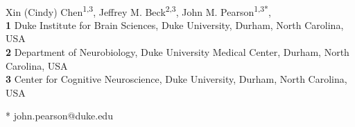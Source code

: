 \documentclass[10pt,letterpaper]{article}
\date{}
\begin{document}
\vspace*{0.2in}

\begin{flushleft}
{\Large
\textbf{} %
}
\newline
\\
Xin (Cindy) Chen\textsuperscript{1,3},
Jeffrey M. Beck\textsuperscript{2,3},
John M. Pearson\textsuperscript{1,3*},
\\
\bigskip
\textbf{1} Duke Institute for Brain Sciences, Duke University, Durham, North Carolina, USA
\\
\textbf{2} Department of Neurobiology, Duke University Medical Center, Durham, North Carolina, USA
\\
\textbf{3} Center for Cognitive Neuroscience, Duke University, Durham, North Carolina, USA
\bigskip

%
%


* john.pearson@duke.edu

\end{flushleft}
\end{document}
